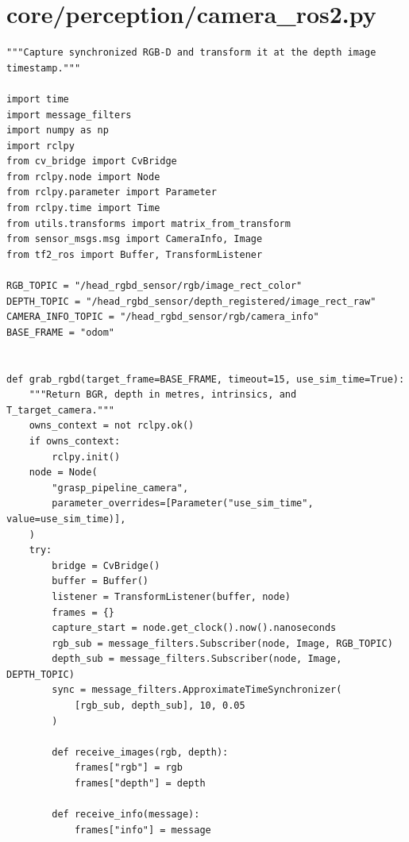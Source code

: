 \documentclass[11pt,a4paper]{book}
\begin{document}
\section{core/perception/camera\_ros2.py}
\begin{lstlisting}
"""Capture synchronized RGB-D and transform it at the depth image timestamp."""

import time
import message_filters
import numpy as np
import rclpy
from cv_bridge import CvBridge
from rclpy.node import Node
from rclpy.parameter import Parameter
from rclpy.time import Time
from utils.transforms import matrix_from_transform
from sensor_msgs.msg import CameraInfo, Image
from tf2_ros import Buffer, TransformListener

RGB_TOPIC = "/head_rgbd_sensor/rgb/image_rect_color"
DEPTH_TOPIC = "/head_rgbd_sensor/depth_registered/image_rect_raw"
CAMERA_INFO_TOPIC = "/head_rgbd_sensor/rgb/camera_info"
BASE_FRAME = "odom"


def grab_rgbd(target_frame=BASE_FRAME, timeout=15, use_sim_time=True):
    """Return BGR, depth in metres, intrinsics, and T_target_camera."""
    owns_context = not rclpy.ok()
    if owns_context:
        rclpy.init()
    node = Node(
        "grasp_pipeline_camera",
        parameter_overrides=[Parameter("use_sim_time", value=use_sim_time)],
    )
    try:
        bridge = CvBridge()
        buffer = Buffer()
        listener = TransformListener(buffer, node)
        frames = {}
        capture_start = node.get_clock().now().nanoseconds
        rgb_sub = message_filters.Subscriber(node, Image, RGB_TOPIC)
        depth_sub = message_filters.Subscriber(node, Image, DEPTH_TOPIC)
        sync = message_filters.ApproximateTimeSynchronizer(
            [rgb_sub, depth_sub], 10, 0.05
        )

        def receive_images(rgb, depth):
            frames["rgb"] = rgb
            frames["depth"] = depth

        def receive_info(message):
            frames["info"] = message


\end{lstlisting}
\end{document}
